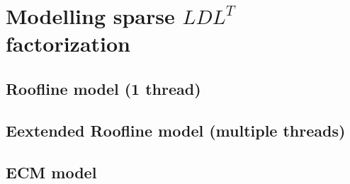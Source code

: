 \chapter{Modelling sparse $LDL^T$ factorization}

\section{Roofline model (1 thread)}

\section{Eextended Roofline model (multiple threads)}

\section{ECM model}